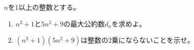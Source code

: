 \documentclass[../../main.tex]{subfiles}
\begin{document}
$n$を1以上の整数とする。
\begin{enumerate}
  \item$n^2+1$と$5n^2+9$の最大公約数$d_n$を求めよ。
  \item$(n^2+1)(5n^2+9)$は整数の2乗にならないことを示せ。
\end{enumerate}
\end{document}

